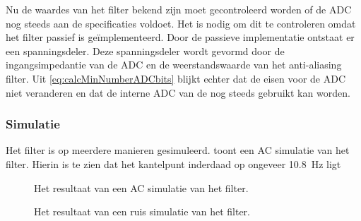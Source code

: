 Nu de waardes van het filter bekend zijn moet gecontroleerd worden of de ADC nog steeds aan de specificaties voldoet. Het is nodig om dit te controleren omdat het filter passief is geïmplementeerd. Door de passieve implementatie ontstaat er een spanningsdeler. Deze spanningsdeler wordt gevormd door de ingangsimpedantie van de ADC en de weerstandswaarde van het anti-aliasing filter. Uit \cref{eq:calcMinNumberADCbits} blijkt echter dat de eisen voor de ADC niet veranderen en dat de interne ADC van de \mcu nog steeds gebruikt kan worden.


\subsubsection{Simulatie}
Het filter is op meerdere manieren gesimuleerd.  toont een AC simulatie van het filter. Hierin is te zien dat het kantelpunt inderdaad op ongeveer \qty{10.8}{\hertz} ligt

\begin{figure}[!htb]
    \centering
    \pgfplotsset{width=0.7\textwidth}
    
    \caption{Het resultaat van een AC simulatie van het filter.}
    \label{fig:filterSimFreq}
\end{figure}

\begin{figure}[!htb]
    \centering
    \pgfplotsset{width=0.7\textwidth}
    
    \caption{Het resultaat van een ruis simulatie van het filter.}
    \label{fig:filterSimNoise}
\end{figure}